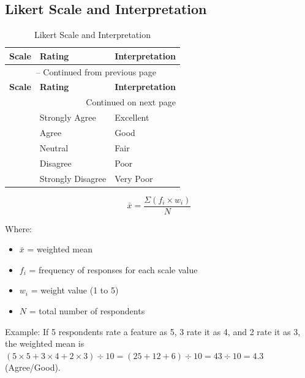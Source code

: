 \documentclass[12pt, a4paper]{report}
\begin{document}
\subsection{Likert Scale and Interpretation}
\label{subsec:likert}
\vspace{0.3cm}
\begin{longtable}{p{2cm} p{4cm} p{5cm}}
    \caption{Likert Scale and Interpretation} \label{tab:likert} \\
    \toprule
    \textbf{Scale} & \textbf{Rating} & \textbf{Interpretation} \\
    \midrule
    \endfirsthead
    \multicolumn{3}{c}{{\tablename\ \thetable{} -- Continued from previous page}} \\
    \toprule
    \textbf{Scale} & \textbf{Rating} & \textbf{Interpretation} \\
    \midrule
    \endhead
    \midrule
    \multicolumn{3}{r}{{Continued on next page}} \\
    \endfoot
    \bottomrule
    \endlastfoot
    5 & Strongly Agree & Excellent \\
    \addlinespace
    4 & Agree & Good \\
    \addlinespace
    3 & Neutral & Fair \\
    \addlinespace
    2 & Disagree & Poor \\
    \addlinespace
    1 & Strongly Disagree & Very Poor \\
\end{longtable}
\vspace{0.3cm}

\begin{equation}
    \bar{x} = \frac{\Sigma (f_i \times w_i)}{N}
\end{equation}

Where:
\begin{itemize}
    \item \(\bar{x}\) = weighted mean
    \item \(f_i\) = frequency of responses for each scale value
    \item \(w_i\) = weight value (1 to 5)
    \item \(N\) = total number of respondents
\end{itemize}

Example: If 5 respondents rate a feature as 5, 3 rate it as 4, and 2 rate it as 3, the weighted mean is \((5\times5 + 3\times4 + 2\times3) \div 10 = (25 + 12 + 6) \div 10 = 43 \div 10 = 4.3\) (Agree/Good).
\end{document}
